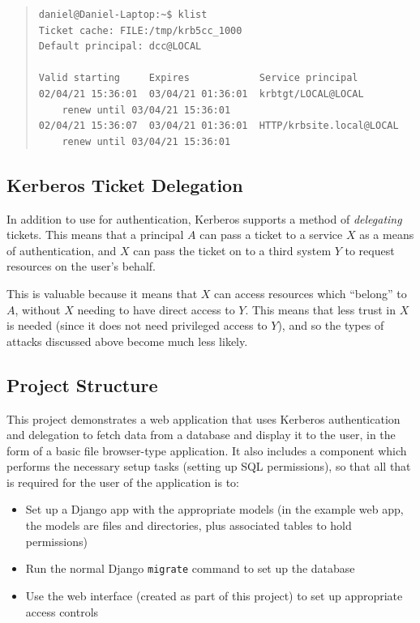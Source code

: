 \documentclass{article}
\begin{document}
\begin{quote}
\begin{verbatim}
daniel@Daniel-Laptop:~$ klist
Ticket cache: FILE:/tmp/krb5cc_1000
Default principal: dcc@LOCAL

Valid starting     Expires            Service principal
02/04/21 15:36:01  03/04/21 01:36:01  krbtgt/LOCAL@LOCAL
	renew until 03/04/21 15:36:01
02/04/21 15:36:07  03/04/21 01:36:01  HTTP/krbsite.local@LOCAL
	renew until 03/04/21 15:36:01
\end{verbatim}
\end{quote}

\subsection{Kerberos Ticket Delegation}
In addition to use for authentication, Kerberos supports a method of \textit{delegating} tickets. This means that a principal $A$ can pass a ticket to a service $X$ as a means of authentication, and $X$ can pass the ticket on to a third system $Y$ to request resources on the user's behalf.

This is valuable because it means that $X$ can access resources which ``belong'' to $A$, without $X$ needing to have direct access to $Y$. This means that less trust in $X$ is needed (since it does not need privileged access to $Y$), and so the types of attacks discussed above become much less likely.

\subsection{Project Structure}
This project demonstrates a web application that uses Kerberos authentication and delegation to fetch data from a database and display it to the user, in the form of a basic file browser-type application. It also includes a component which performs the necessary setup tasks (setting up SQL permissions), so that all that is required for the user of the application is to:
\begin{itemize}
\item
  Set up a Django app with the appropriate models (in the example web app, the models are files and directories, plus associated tables to hold permissions)
\item
  Run the normal Django \texttt{migrate} command to set up the database
\item
  Use the web interface (created as part of this project) to set up appropriate access controls
\end{itemize}
\end{document}
